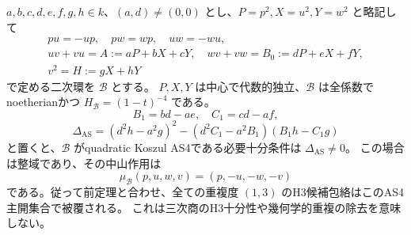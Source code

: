 \begin{theorem}
\label{thm:h3-order2-eight-coefficient-AS4}
$a,b,c,d,e,f,g,h\in k$、$(a,d)\ne(0,0)$ とし、$P=p^2,X=u^2,Y=w^2$ と略記して
\begin{equation}\label{eq:h3-order2-eight-coefficient-family}
 \begin{gathered}
 pu=-up,\quad pw=wp,\quad uw=-wu,\\
 uv+vu=A:=aP+bX+cY,\quad wv+vw=B_0:=dP+eX+fY,\\
 v^2=H:=gX+hY
 \end{gathered}
\end{equation}
で定める二次環を $\mathcal B$ とする。
$P,X,Y$ は中心で代数的独立、$\mathcal B$ は全係数でnoetherianかつ
$H_{\mathcal B}=(1-t)^{-4}$ である。
\[
 B_1=bd-ae,\quad C_1=cd-af,
\]
\begin{equation}\label{eq:h3-order2-eight-AS-resultant}
 \Delta_{\mathrm{AS}}=(d^2h-a^2g)^2-(d^2C_1-a^2B_1)(B_1h-C_1g)
\end{equation}
と置くと、$\mathcal B$ がquadratic Koszul AS4である必要十分条件は $\Delta_{\mathrm{AS}}\ne0$。
この場合は整域であり、その中山作用は
\[
 \mu_{\mathcal B}(p,u,w,v)=(p,-u,-w,-v)
\]
である。従って前定理と合わせ、全ての重複度 $(1,3)$ のH3候補包絡はこのAS4主開集合で被覆される。
これは三次商のH3十分性や幾何学的重複の除去を意味しない。
\end{theorem}
